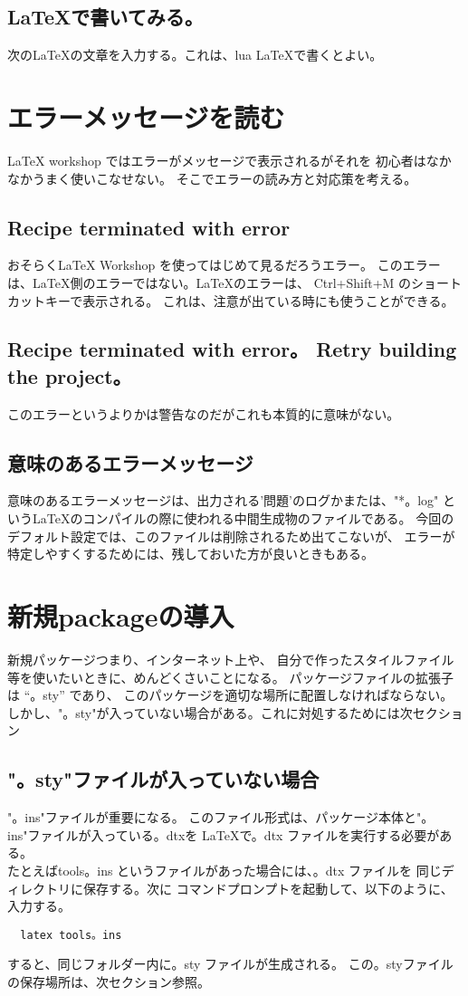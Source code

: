 \documentclass{ltjsarticle}
\begin{document}
\subsection{\LaTeX で書いてみる。}
次の\LaTeX の文章を入力する。これは、lua \LaTeX で書くとよい。


\section{エラーメッセージを読む}
LaTeX workshop ではエラーがメッセージで表示されるがそれを
初心者はなかなかうまく使いこなせない。
そこでエラーの読み方と対応策を考える。
\subsection{Recipe terminated with error}
おそらくLaTeX Workshop を使ってはじめて見るだろうエラー。
このエラーは、LaTeX側のエラーではない。LaTeXのエラーは、
Ctrl+Shift+M のショートカットキーで表示される。
これは、注意が出ている時にも使うことができる。
\subsection{Recipe terminated with error。 Retry building the project。}
このエラーというよりかは警告なのだがこれも本質的に意味がない。
\subsection{意味のあるエラーメッセージ}
意味のあるエラーメッセージは、出力される'問題'のログかまたは、"*。log"
というLaTeXのコンパイルの際に使われる中間生成物のファイルである。
今回のデフォルト設定では、このファイルは削除されるため出てこないが、
エラーが特定しやすくするためには、残しておいた方が良いときもある。

\section{新規packageの導入}
新規パッケージつまり、インターネット上や、
自分で作ったスタイルファイル等を使いたいときに、めんどくさいことになる。
パッケージファイルの拡張子は “。sty” であり、
このパッケージを適切な場所に配置しなければならない。
しかし、"。sty"が入っていない場合がある。これに対処するためには次セクション
\subsection{"。sty"ファイルが入っていない場合}
"。ins"ファイルが重要になる。
このファイル形式は、パッケージ本体と"。ins"ファイルが入っている。dtxを
LaTeXで。dtx ファイルを実行する必要がある。\\
たとえばtools。ins というファイルがあった場合には、。dtx ファイルを
同じディレクトリに保存する。次に
コマンドプロンプトを起動して、以下のように、入力する。
\begin{verbatim}
  latex tools。ins
\end{verbatim}
すると、同じフォルダー内に。sty ファイルが生成される。
この。styファイルの保存場所は、次セクション参照。
\end{document}
